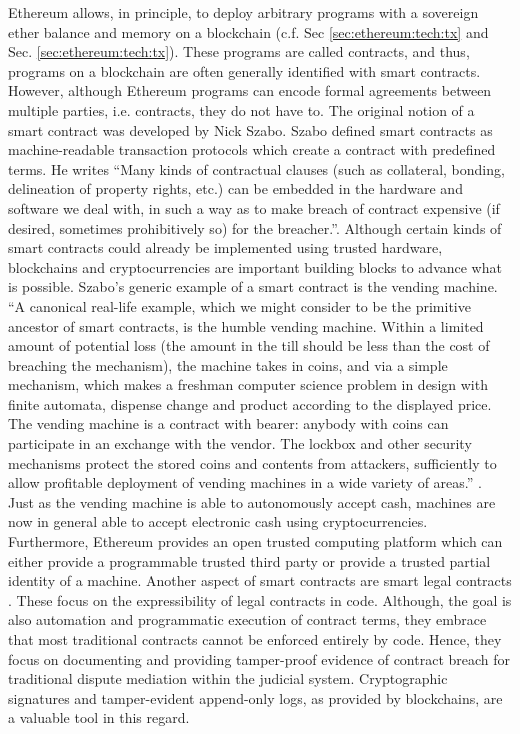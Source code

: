 Ethereum allows, in principle, to deploy arbitrary programs with a sovereign ether balance and memory on a blockchain (c.f. Sec \ref{sec:ethereum:tech:tx} and Sec. \ref{sec:ethereum:tech:tx}). These programs are called contracts, and thus, programs on a blockchain are often generally identified with smart contracts. However, although Ethereum programs can encode formal agreements between multiple parties, i.e. contracts, they do not have to.
The original notion of a smart contract was developed by Nick Szabo. Szabo defined smart contracts as machine-readable transaction protocols which create a contract with predefined terms. He writes “Many kinds of contractual clauses (such as collateral, bonding, delineation of property rights, etc.) can be embedded in the hardware and software we deal with, in such a way as to make breach of contract expensive (if desired, sometimes prohibitively so) for the breacher.”.  Although certain kinds of smart contracts could already be implemented using trusted hardware, blockchains and cryptocurrencies are important building blocks to advance what is possible. Szabo’s generic example of a smart contract is the vending machine. 
“A canonical real-life example, which we might consider to be the primitive ancestor of smart contracts, is the humble vending machine. Within a limited amount of potential loss (the amount in the till should be less than the cost of breaching the mechanism), the machine takes in coins, and via a simple mechanism, which makes a freshman computer science problem in design with finite automata, dispense change and product according to the displayed price. The vending machine is a contract with bearer: anybody with coins can participate in an exchange with the vendor. The lockbox and other security mechanisms protect the stored coins and contents from attackers, sufficiently to allow profitable deployment of vending machines in a wide variety of areas.” \parencite{szabo1997}. Just as the vending machine is able to autonomously accept cash, machines are now in general able to accept electronic cash using cryptocurrencies.  Furthermore, Ethereum provides an open trusted computing platform which can either provide a programmable trusted third party or provide a trusted partial identity of a machine. Another aspect of smart contracts are smart legal contracts \parencite{1319505,DBLP:journals/corr/ClackBB16}. These focus on the expressibility of legal contracts in code. Although, the goal is also automation and programmatic execution of contract terms, they embrace that most traditional contracts cannot be enforced entirely by code. Hence, they focus on documenting and providing tamper-proof evidence of contract breach for traditional dispute mediation within the judicial system. Cryptographic signatures and tamper-evident append-only logs, as provided by blockchains, are a valuable tool in this regard.

